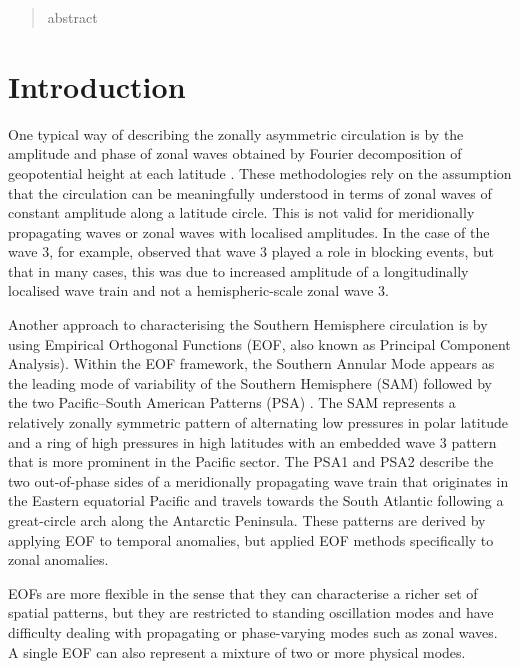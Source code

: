 \documentclass[smallextended]{svjour3}       %
\begin{document}
\begin{abstract}
abstract
\\
\keywords{
         \and
    }


\end{abstract}


\def\spacingset#1{\renewcommand{\baselinestretch}%
{#1}\small\normalsize} \spacingset{1}


\hypertarget{introduction}{%
\section{Introduction}\label{introduction}}

One typical way of describing the zonally asymmetric circulation is by the amplitude and phase of zonal waves obtained by Fourier decomposition of geopotential height at each latitude \citep[e.g.][]{vanloon1972, trenberth1980}. These methodologies rely on the assumption that the circulation can be meaningfully understood in terms of zonal waves of constant amplitude along a latitude circle. This is not valid for meridionally propagating waves or zonal waves with localised amplitudes. In the case of the wave 3, for example, \citet{trenberth1985} observed that wave 3 played a role in blocking events, but that in many cases, this was due to increased amplitude of a longitudinally localised wave train and not a hemispheric-scale zonal wave 3.

Another approach to characterising the Southern Hemisphere circulation is by using Empirical Orthogonal Functions (EOF, also known as Principal Component Analysis). Within the EOF framework, the Southern Annular Mode appears as the leading mode of variability of the Southern Hemisphere (SAM) \citep{fogt2020} followed by the two Pacific--South American Patterns (PSA) \citep{mo2001}. The SAM represents a relatively zonally symmetric pattern of alternating low pressures in polar latitude and a ring of high pressures in high latitudes with an embedded wave 3 pattern that is more prominent in the Pacific sector. The PSA1 and PSA2 describe the two out-of-phase sides of a meridionally propagating wave train that originates in the Eastern equatorial Pacific and travels towards the South Atlantic following a great-circle arch along the Antarctic Peninsula. These patterns are derived by applying EOF to temporal anomalies, but \citet{raphael2003} applied EOF methods specifically to zonal anomalies.

EOFs are more flexible in the sense that they can characterise a richer set of spatial patterns, but they are restricted to standing oscillation modes and have difficulty dealing with propagating or phase-varying modes such as zonal waves. A single EOF can also represent a mixture of two or more physical modes.
\end{document}
